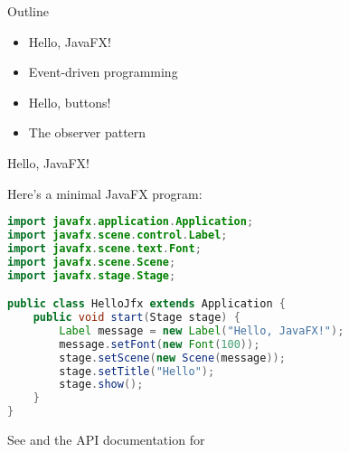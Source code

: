 \documentclass{beamer}
\begin{document}
\begin{frame}
  \titlepage
\end{frame}

\begin{frame}[fragile]{Outline}


\begin{itemize}
\item Hello, JavaFX!
\item Event-driven programming
\item Hello, buttons!
\item The observer pattern
\end{itemize}


\end{frame}

\begin{frame}[fragile]{Hello, JavaFX!}


Here's a minimal JavaFX program:
\begin{lstlisting}[language=Java]
import javafx.application.Application;
import javafx.scene.control.Label;
import javafx.scene.text.Font;
import javafx.scene.Scene;
import javafx.stage.Stage;

public class HelloJfx extends Application {
    public void start(Stage stage) {
        Label message = new Label("Hello, JavaFX!");
        message.setFont(new Font(100));
        stage.setScene(new Scene(message));
        stage.setTitle("Hello");
        stage.show();
    }
}
\end{lstlisting}

See  and the API documentation for 

\end{frame}
\end{document}
